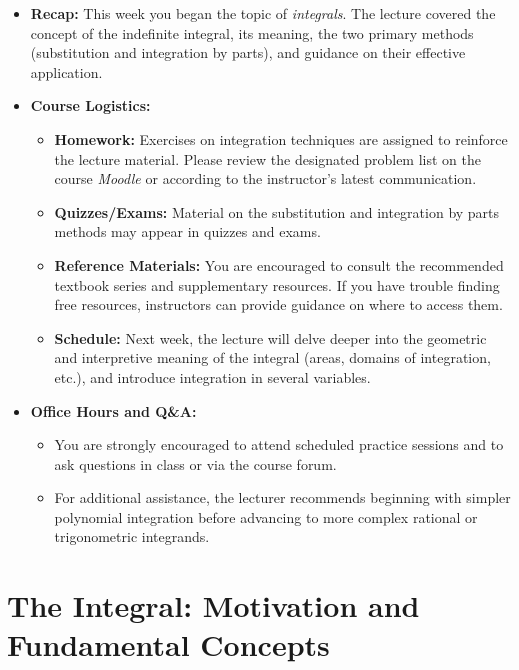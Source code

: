 \documentclass[11pt]{article}
\theoremstyle{definition}
\begin{document}

\begin{administrative_note}
    \begin{itemize}
        \item \textbf{Recap:} This week you began the topic of \emph{integrals}. The lecture covered the concept of the indefinite integral, its meaning, the two primary methods (substitution and integration by parts), and guidance on their effective application.
        \item \textbf{Course Logistics:}
            \begin{itemize}
                \item \textbf{Homework:} Exercises on integration techniques are assigned to reinforce the lecture material. Please review the designated problem list on the course \emph{Moodle} or according to the instructor's latest communication.
                \item \textbf{Quizzes/Exams:} Material on the substitution and integration by parts methods may appear in quizzes and exams.
                \item \textbf{Reference Materials:} You are encouraged to consult the recommended textbook series and supplementary resources. If you have trouble finding free resources, instructors can provide guidance on where to access them.
                \item \textbf{Schedule:} Next week, the lecture will delve deeper into the geometric and interpretive meaning of the integral (areas, domains of integration, etc.), and introduce integration in several variables.
            \end{itemize}
        \item \textbf{Office Hours and Q\&A:}
            \begin{itemize}
                \item You are strongly encouraged to attend scheduled practice sessions and to ask questions in class or via the course forum.
                \item For additional assistance, the lecturer recommends beginning with simpler polynomial integration before advancing to more complex rational or trigonometric integrands.
            \end{itemize}
    \end{itemize}
\end{administrative_note}

\section*{The Integral: Motivation and Fundamental Concepts}
\end{document}
